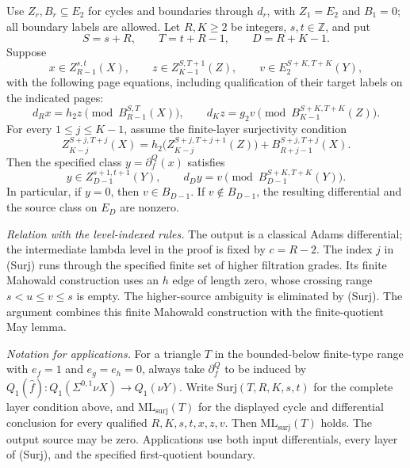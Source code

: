 \begin{theorem}
Use $Z_r,B_r\subseteq E_2$ for cycles and boundaries through $d_r$,
with $Z_1=E_2$ and $B_1=0$; all boundary labels are allowed.
Let $R,K\geq2$ be integers, $s,t\in\mathbb Z$, and put
\[
S=s+R,\qquad T=t+R-1,\qquad D=R+K-1.
\]
Suppose
\[
x\in Z_{R-1}^{s,t}(X),\qquad
z\in Z_{K-1}^{S,T+1}(Z),\qquad
v\in E_2^{S+K,T+K}(Y),
\]
with the following page equations, including qualification of
their target labels on the indicated pages:
\[
d_Rx=h_2z\pmod{B_{R-1}^{S,T}(X)},\qquad
d_Kz=g_2v\pmod{B_{K-1}^{S+K,T+K}(Z)}.
\]
For every $1\leq j\leq K-1$, assume the finite-layer surjectivity condition
\[
Z_{K-j}^{S+j,T+j}(X)
=h_2\bigl(Z_{K-j}^{S+j,T+j+1}(Z)\bigr)
 +B_{R+j-1}^{S+j,T+j}(X).
\tag{Surj}
\]
Then the specified class $y=\partial_f^Q(x)$ satisfies
\[
y\in Z_{D-1}^{s+1,t+1}(Y),\qquad
d_Dy=v\pmod{B_{D-1}^{S+K,T+K}(Y)}.
\]
In particular, if $y=0$, then $v\in B_{D-1}$.
If $v\notin B_{D-1}$, the resulting differential and the source class
on $E_D$ are nonzero.

\textit{Relation with the level-indexed rules.}
The output is a classical Adams differential; the intermediate lambda
level in the proof is fixed by $c=R-2$. The index $j$ in (Surj) runs through the specified finite set
of higher filtration grades.
Its finite Mahowald construction uses an $h$ edge of length zero,
whose crossing range $s<u\leq v\leq s$ is empty. The higher-source
ambiguity is eliminated by (Surj). The argument combines this finite
Mahowald construction with the finite-quotient May lemma.

\textit{Notation for applications.}
For a triangle $T$ in the bounded-below finite-type range with
$e_f=1$ and $e_g=e_h=0$, always take $\partial_f^Q$ to be induced by
$Q_1(\widehat f):Q_1(\Sigma^{0,1}\nu X)\to Q_1(\nu Y)$.
Write $\mathrm{Surj}(T,R,K,s,t)$ for the complete
layer condition above, and $\mathrm{ML}_{\mathrm{surj}}(T)$ for the
displayed cycle and differential conclusion for every qualified
$R,K,s,t,x,z,v$.
Then $\mathrm{ML}_{\mathrm{surj}}(T)$ holds. The output source may be zero. Applications use both input differentials,
every layer of (Surj), and the specified first-quotient boundary.
\end{theorem}
